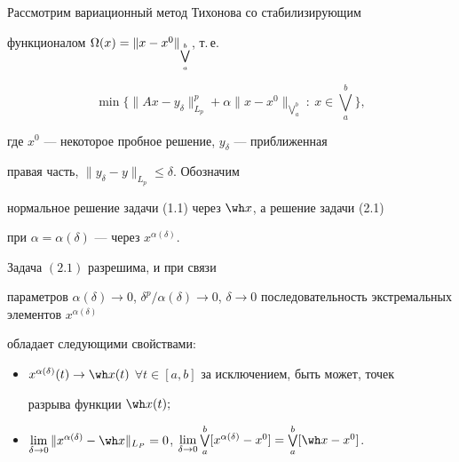 Рассмотрим вариационный метод Тихонова со стабилизирующим


функционалом $\Omega (x)=\linebreak \|x-x^0\|_{\bigvee \limits_a^b }$, т.\,е.


\begin{equation}


\min \Big\{\|Ax-y_{\delta}\|_{L_p}^p + \alpha \|x-x^0\|_{\bigvee\limits_a^b}


\ : \ x\in \textstyle\bigvee\limits_a^b\Big\},


\end{equation}


где $x^0$ --- некоторое пробное решение, $y_{\delta}$ --- приближенная


правая часть, $\|y_{\delta}-y\|_{L_p} \le \delta$. Обозначим


нормальное решение задачи (1.1) через $\wh x$, а решение задачи (2.1)


при $\alpha = \alpha(\delta)$ --- через $x^{ \alpha(\delta)}$.





\begin{thms}


Задача $(2.1)$ разрешима, и при связи


параметров $\alpha(\delta)\to0$, $\delta^p / \alpha(\delta) \to 0$, $\delta


\to 0$ последовательность экстремальных элементов $x^{\alpha(\delta)}$


обладает следующими свойствами\/$:$


\begin{itemize}


\item[1)] $x^{\alpha(\delta)}(t) \to \wh


x(t)$ $\forall t\in[a,b]$ за исключением, быть может, точек


разрыва функции $\wh x(t);$


\item[2)] $\lim\limits_{\delta \to 0} \|x^{\alpha(\delta)}


-\wh x\|_{L_P} = 0$, $\lim \limits_{\delta \to 0} \bigvee \limits_a^b


[x^{\alpha(\delta)}- x^0] = \bigvee \limits_a^b[\wh x- x^0]$.


\end{itemize}


\end{thms} 





